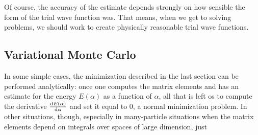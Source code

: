 \documentclass[12pt]{article}
\numberwithin{equation}{section}
\begin{document}
Of course, the accuracy of the estimate depends strongly on how sensible the form of the trial wave function was.  That means, when we get to solving problems, we should work to create physically reasonable trial wave functions.

\subsection{Variational Monte Carlo}
In some simple cases, the minimization described in the last section can be performed analytically: once one computes the matrix elements and has an estimate for the energy $E(\alpha)$ as a function of $\alpha$, all that is left os to compute the derivative $\dv{E(\alpha)}{\alpha}$ and set it equal to $0$, a normal minimization problem.  In other situations, though, especially in many-particle situations when the matrix elements depend on integrals over spaces of large dimension, just 
\end{document}
